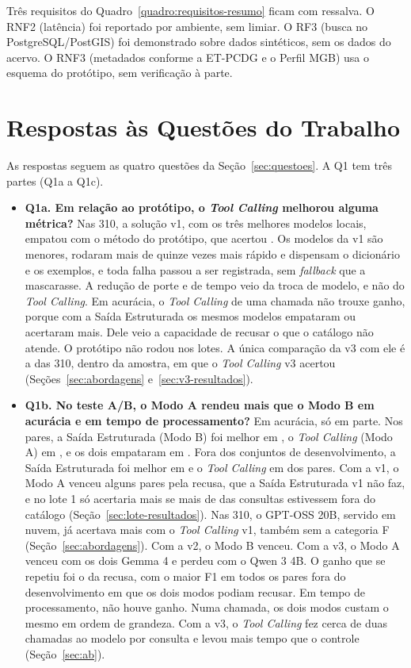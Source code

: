 Três requisitos do Quadro~\ref{quadro:requisitos-resumo} ficam com ressalva. O RNF2 (latência) foi reportado por ambiente, sem limiar. O RF3 (busca no PostgreSQL/PostGIS) foi demonstrado sobre dados sintéticos, sem os dados do acervo. O RNF3 (metadados conforme a ET-PCDG e o Perfil MGB) usa o esquema do protótipo, sem verificação à parte.

\section{Respostas às Questões do Trabalho}
\label{sec:respostas}

As respostas seguem as quatro questões da Seção~\ref{sec:questoes}. A Q1 tem três partes (Q1a a Q1c).
\begin{itemize}
  \item \textbf{Q1a. Em relação ao protótipo, o \textit{Tool Calling} melhorou alguma métrica?} Nas 310, a solução v1, com os três melhores modelos locais, empatou com o método do protótipo, que acertou . Os modelos da v1 são menores, rodaram mais de quinze vezes mais rápido e dispensam o dicionário e os exemplos, e toda falha passou a ser registrada, sem \textit{fallback} que a mascarasse. A redução de porte e de tempo veio da troca de modelo, e não do \textit{Tool Calling}. Em acurácia, o \textit{Tool Calling} de uma chamada não trouxe ganho, porque com a Saída Estruturada os mesmos modelos empataram ou acertaram mais. Dele veio a capacidade de recusar o que o catálogo não atende. O protótipo não rodou nos lotes. A única comparação da v3 com ele é a das 310, dentro da amostra, em que o \textit{Tool Calling} v3 acertou  (Seções~\ref{sec:abordagens} e~\ref{sec:v3-resultados}).
  \item \textbf{Q1b. No teste A/B, o Modo A rendeu mais que o Modo B em acurácia e em tempo de processamento?} Em acurácia, só em parte. Nos  pares, a Saída Estruturada (Modo B) foi melhor em , o \textit{Tool Calling} (Modo A) em , e os dois empataram em . Fora dos conjuntos de desenvolvimento, a Saída Estruturada foi melhor em  e o \textit{Tool Calling} em  dos  pares. Com a v1, o Modo A venceu alguns pares pela recusa, que a Saída Estruturada v1 não faz, e no lote 1 só acertaria mais se mais de  das consultas estivessem fora do catálogo (Seção~\ref{sec:lote-resultados}). Nas 310, o GPT-OSS 20B, servido em nuvem, já acertava mais com o \textit{Tool Calling} v1, também sem a categoria F (Seção~\ref{sec:abordagens}). Com a v2, o Modo B venceu. Com a v3, o Modo A venceu com os dois Gemma 4 e perdeu com o Qwen 3 4B. O ganho que se repetiu foi o da recusa, com o maior F1 em todos os pares fora do desenvolvimento em que os dois modos podiam recusar. Em tempo de processamento, não houve ganho. Numa chamada, os dois modos custam o mesmo em ordem de grandeza. Com a v3, o \textit{Tool Calling} fez cerca de duas chamadas ao modelo por consulta e levou mais tempo que o controle (Seção~\ref{sec:ab}).

\end{itemize}
